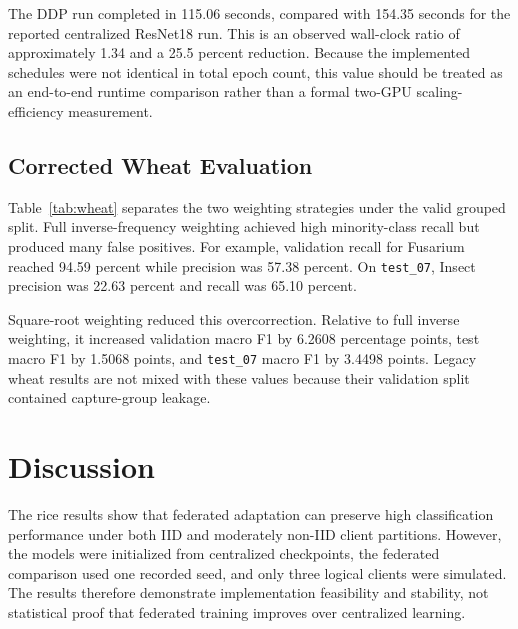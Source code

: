 \documentclass[conference]{IEEEtran}
\begin{document}
The DDP run completed in 115.06 seconds, compared with 154.35 seconds for the reported centralized ResNet18 run. This is an observed wall-clock ratio of approximately 1.34 and a 25.5 percent reduction. Because the implemented schedules were not identical in total epoch count, this value should be treated as an end-to-end runtime comparison rather than a formal two-GPU scaling-efficiency measurement.

\subsection{Corrected Wheat Evaluation}

Table~\ref{tab:wheat} separates the two weighting strategies under the valid grouped split. Full inverse-frequency weighting achieved high minority-class recall but produced many false positives. For example, validation recall for Fusarium reached 94.59 percent while precision was 57.38 percent. On \texttt{test\_07}, Insect precision was 22.63 percent and recall was 65.10 percent.

Square-root weighting reduced this overcorrection. Relative to full inverse weighting, it increased validation macro F1 by 6.2608 percentage points, test macro F1 by 1.5068 points, and \texttt{test\_07} macro F1 by 3.4498 points. Legacy wheat results are not mixed with these values because their validation split contained capture-group leakage.

\begin{table}[t]
\caption{Wheat Macro F1 Under the Corrected Grouped Split}
\label{tab:wheat}
\centering
{}
\end{table}

\section{Discussion}

The rice results show that federated adaptation can preserve high classification performance under both IID and moderately non-IID client partitions. However, the models were initialized from centralized checkpoints, the federated comparison used one recorded seed, and only three logical clients were simulated. The results therefore demonstrate implementation feasibility and stability, not statistical proof that federated training improves over centralized learning.
\end{document}
